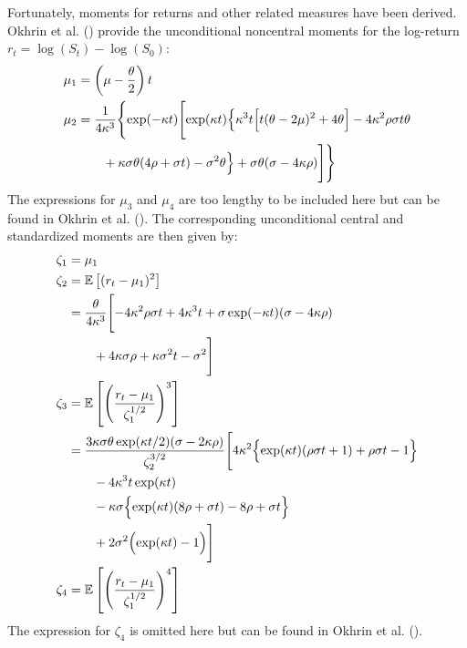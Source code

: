 Fortunately, moments for returns and other related measures have been derived. Okhrin et al. (\citeyear{okhrinSimulatingCoxIngersoll2022}) provide the unconditional noncentral moments for the log-return $r_t = \log(S_t) - \log(S_0)$:
\begin{align}
    \mu_1 &= \left(\mu - \frac{\theta}{2}\right)t \notag \\
    \mu_2 &= \frac{1}{4\kappa^3}\Biggl\{
        \exp(-\kappa t)\Biggl[
            \exp(\kappa t)\Bigl\{
                \kappa^3 t\Bigl[t(\theta-2\mu)^2 + 4\theta\Bigr] 
                - 4\kappa^2\rho\sigma t\theta \notag \\
            &\quad\quad + \kappa\sigma\theta(4\rho + \sigma t)
                - \sigma^2\theta
            \Bigr\} + \sigma\theta(\sigma-4\kappa\rho)
        \Biggr]
    \Biggr\} \notag
\end{align}
The expressions for $\mu_3$ and $\mu_4$ are too lengthy to be included here but can be found in Okhrin et al. (\citeyear{okhrinSimulatingCoxIngersoll2022}). The corresponding unconditional central and standardized moments are then given by:
\begin{align}
    \zeta_1 &= \mu_1 \notag \\
    \zeta_2 &= \mathbb{E}\left[(r_t-\mu_1)^2\right] \notag \\
    &=\frac{\theta}{4\kappa^3}\Biggl[
        -4\kappa^2\rho\sigma t + 4\kappa^3 t + \sigma\exp(-\kappa t)(\sigma - 4\kappa\rho) \notag\\
    &\quad\quad + 4\kappa\sigma\rho + \kappa\sigma^2 t - \sigma^2
    \Biggr] \notag \\
    \zeta_3 &= \mathbb{E}\left[\left(\frac{r_t-\mu_1}{\zeta_1^{1/2}}\right)^3\right] \notag \\
    &=\frac{3\kappa\sigma\theta\exp(\kappa t/2)(\sigma - 2\kappa\rho)}{\zeta_2^{3/2}}
    \Biggl[
        4\kappa^2\Bigl\{\exp(\kappa t)(\rho\sigma t+1) + \rho\sigma t - 1\Bigr\} \notag\\
    &\quad\quad - 4\kappa^3 t\exp(\kappa t) \notag\\
    &\quad\quad - \kappa\sigma\Bigl\{\exp(\kappa t)(8\rho + \sigma t) - 8\rho + \sigma t\Bigr\} \notag\\
    &\quad\quad + 2\sigma^2\Bigl(\exp(\kappa t)-1\Bigr)
    \Biggr] \notag \\
    \zeta_4 &= \mathbb{E}\left[\left(\frac{r_t-\mu_1}{\zeta_1^{1/2}}\right)^4\right] \notag
\end{align}
The expression for $\zeta_4$ is omitted here but can be found in Okhrin et al. (\citeyear{okhrinSimulatingCoxIngersoll2022}).


